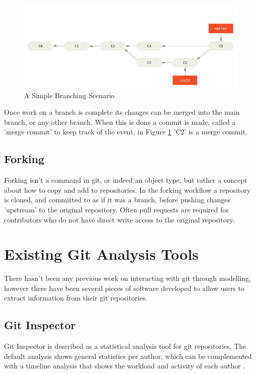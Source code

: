 \documentclass[11pt]{book}
\begin{document}
\begin{figure}[h]
	\centering
	\includegraphics[width=\textwidth]{images/basicbranching}
	\caption{A Simple Branching Scenario \cite{gitbasicbranching}}
	\label{fig:gitbranching}
\end{figure} 

Once work on a branch is complete its changes can be merged into the main branch, or any other branch. When this is done a commit is made, called a 'merge commit' to keep track of the event, in Figure \ref{fig:gitbranching} 'C2' is a merge commit.

\subsection{Forking}
Forking isn't a command in git, or indeed an object type, but rather a concept about how to copy and add to repositories. In the forking workflow \cite{forkingworkflow} a repository is cloned, and committed to as if it was a branch, before pushing changes 'upstream' to the original repository. Often pull requests are required for contributors who do not have direct write access to the original repository.

\section{Existing Git Analysis Tools}
There hasn't been any previous work on interacting with git through modelling, however there have been several pieces of software developed to allow users to extract information from their git repositories.

\subsection{Git Inspector}
Git Inspector is described as a statistical analysis tool for git repositories. The default analysis shows general statistics per author, which can be complemented with a timeline analysis that shows the workload and activity of each author \cite{gitinspector}.
\end{document}
